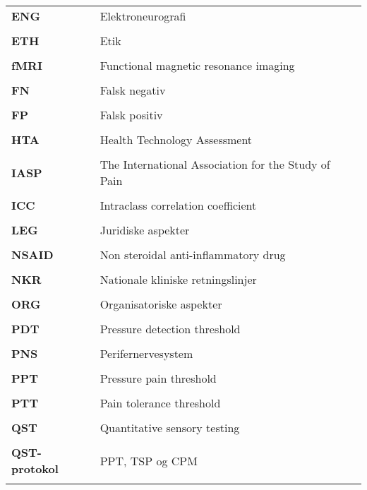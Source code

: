 \begin{longtable}{p{}  p{}}
\textbf{ENG} & Elektroneurografi                                         
\\ \\
\textbf{ETH} & Etik
\\ \\
\textbf{fMRI}& Functional magnetic resonance imaging                    
\\ \\
\textbf{FN}  & Falsk negativ                                           
\\ \\
\textbf{FP}  & Falsk positiv                                           
\\ \\
\textbf{HTA} & Health Technology Assessment 
\\ \\
\textbf{IASP}& The International Association for the Study of Pain      
\\ \\
\textbf{ICC} & Intraclass correlation coefficient                     
\\ \\
\textbf{LEG} & Juridiske aspekter  
\\ \\
\textbf{NSAID} & Non steroidal anti-inflammatory drug                                  
\\ \\
\textbf{NKR} & Nationale kliniske retningslinjer             
\\ \\
\textbf{ORG} & Organisatoriske aspekter                                 
\\ \\
\textbf{PDT} & Pressure detection threshold  
\\ \\
\textbf{PNS} & Perifernervesystem                                      
\\ \\
\textbf{PPT} & Pressure pain threshold                            
\\ \\
\textbf{PTT} & Pain tolerance threshold                                 
\\ \\
\textbf{QST} & Quantitative sensory testing  
\\ \\
\textbf{QST-protokol} & PPT, TSP og CPM                           
\\ \\

\end{longtable}
